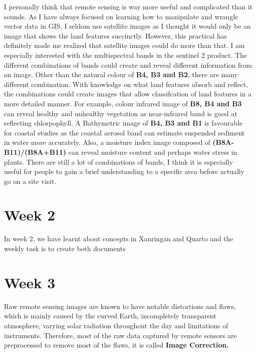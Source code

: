 \documentclass[
  letterpaper,
  DIV=11,
  numbers=noendperiod]{scrreprt}
\begin{document}
I personally think that remote sensing is way more useful and
complicated than it sounds. As I have always focused on learning how to
manipulate and wrangle vector data in GIS, I seldom use satellite images
as I thought it would only be an image that shows the land features
succinctly. However, this practical has definitely made me realized that
satellite images could do more than that. I am especially interested
with the multispectral bands in the sentinel 2 product. The different
combinations of bands could create and reveal different information from
an image. Other than the natural colour of \textbf{B4, B3 and B2}, there
are many different combination. With knowledge on what land features
absorb and reflect, the combinations could create images that allow
classifcation of land features in a more detailed manner. For example,
colour infrared image of \textbf{B8, B4 and B3} can reveal healthy and
unhealthy vegetation as near-infrared band is good at reflecting
chlorpophyll. A Bathymetric image of \textbf{B4, B3 and B1} is
favourable for coastal studies as the coastal aerosol band can estimate
suspended sediment in water more accurately. Also, a moisture index
image composed of \textbf{(B8A-B11)/(B8A+B11)} can reveal moisture
content and perhaps water stress in plants. There are still a lot of
combinations of bands, I think it is especially useful for people to
gain a brief understanding to a specific area before actually go on a
site visit.


\hypertarget{week-2}{%
\chapter{Week 2}\label{week-2}}

In week 2, we have learnt about concepts in Xanringan and Quarto and the
weekly task is to create both documents


\hypertarget{week-3}{%
\chapter{Week 3}\label{week-3}}

Raw remote sensing images are known to have notable distortions and
flaws, which is mainly caused by the curved Earth, incompletely
transparent atmosphere, varying solar radiation throughout the day and
limitations of instruments. Therefore, most of the raw data captured by
remote sensors are preprocessed to remove most of the flaws, it is
called \textbf{Image Correction.}
\end{document}
